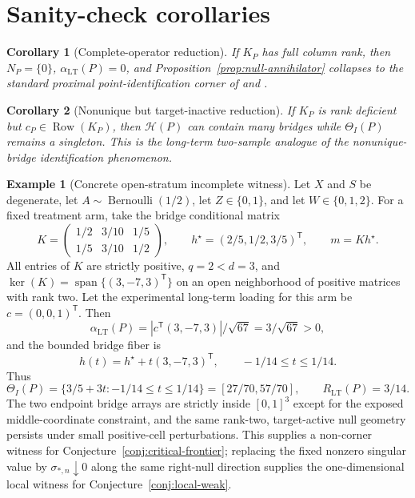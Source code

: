 \documentclass[11pt]{article}
\newcommand{\transpose}{\mathsf{T}}
\newcommand{\calH}{\mathcal{H}}
\theoremstyle{definition}
\newtheorem{example}{Example}
\theoremstyle{plain}
\newtheorem{corollary}{Corollary}
\theoremstyle{remark}
\begin{document}
\section{Sanity-check corollaries}
\begin{corollary}[Complete-operator reduction]\label{cor:complete}
If \(K_P\) has full column rank, then \(N_P=\{0\}\),
\(\alpha_{\mathrm{LT}}(P)=0\), and Proposition~\ref{prop:null-annihilator} collapses
to the standard proximal point-identification corner of
\citet{MiaoGengTchetgen2018} and \citet{CuiPuShiMiaoTchetgen2024}.
\end{corollary}

\begin{corollary}[Nonunique but target-inactive reduction]\label{cor:nonunique}
If \(K_P\) is rank deficient but \(c_P\in\operatorname{Row}(K_P)\), then
\(\calH(P)\) can contain many bridges while \(\Theta_I(P)\) remains a
singleton.  This is the long-term two-sample analogue of the
\citet{ZhangLiMiaoTchetgen2023} nonunique-bridge identification phenomenon.
\end{corollary}

\begin{example}[Concrete open-stratum incomplete witness]\label{ex:witness}
Let \(X\) and \(S\) be degenerate, let \(A\sim\operatorname{Bernoulli}(1/2)\),
let \(Z\in\{0,1\}\), and let \(W\in\{0,1,2\}\).  For a fixed treatment arm,
take the bridge conditional matrix
\[
K=
\begin{pmatrix}
1/2&3/10&1/5\\
1/5&3/10&1/2
\end{pmatrix},
\qquad
h^\star=(2/5,1/2,3/5)^\transpose,\qquad
m=Kh^\star .
\]
All entries of \(K\) are strictly positive, \(q=2<d=3\), and
\(\ker(K)=\operatorname{span}\{(3,-7,3)^\transpose\}\) on an open neighborhood
of positive matrices with rank two.  Let the experimental long-term loading for
this arm be \(c=(0,0,1)^\transpose\).  Then
\[
\alpha_{\mathrm{LT}}(P)=|c^\transpose(3,-7,3)|/\sqrt{67}=3/\sqrt{67}>0,
\]
and the bounded bridge fiber is
\[
  h(t)=h^\star+t(3,-7,3)^\transpose,\qquad -1/14\le t\le1/14.
\]
Thus
\[
\Theta_I(P)=\{3/5+3t:-1/14\le t\le1/14\}
=[27/70,57/70],\qquad R_{\mathrm{LT}}(P)=3/14.
\]
The two endpoint bridge arrays are strictly inside \([0,1]^3\) except for the
exposed middle-coordinate constraint, and the same rank-two, target-active
null geometry persists under small positive-cell perturbations.  This supplies
a non-corner witness for Conjecture~\ref{conj:critical-frontier}; replacing the
fixed nonzero singular value by \(\sigma_{*,n}\downarrow0\) along the same
right-null direction supplies the one-dimensional local witness for
Conjecture~\ref{conj:local-weak}.
\end{example}
\end{document}
